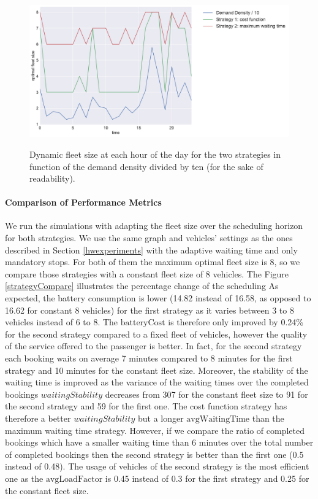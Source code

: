 \documentclass[12pt,a4paper]{article}
\begin{document}
\begin{figure}[h] 
  \centering
  \caption{Dynamic fleet size at each hour of the day for the two strategies in function of the demand density divided by ten (for the sake of readability).}
\includegraphics[scale=0.43]{./images/optimalFleet.pdf}
\label{optfleet}
\end{figure}

\paragraph{Comparison of Performance Metrics}
We run the simulations with adapting the fleet size over the scheduling horizon for both strategies. We use the same graph and vehicles' settings as the ones described in Section \ref{hwexperiments} with the adaptive waiting time and only mandatory stops. For both of them the maximum optimal fleet size is 8, so we compare those strategies with a constant fleet size of 8 vehicles. The Figure \ref{strategyCompare} illustrates the percentage change of the scheduling  As expected, the battery consumption is lower (14.82 instead of 16.58, as opposed to 16.62 for constant 8 vehicles) for the first strategy as it varies between 3 to 8 vehicles instead of 6 to 8. The $\text{batteryCost}$ is therefore only improved by 0.24\% for the second strategy compared to a fixed fleet of vehicles, however the quality of the service offered to the passenger is better. In fact, for the second strategy each booking waits on average 7 minutes compared to 8 minutes for the first strategy and 10 minutes for the constant fleet size. Moreover, the stability of the waiting time is improved as the variance of the waiting times over the completed bookings $waitingStability$ decreases from 307 for the constant fleet size to 91 for the second strategy and 59 for the first one. The cost function strategy has therefore a better $waitingStability$ but a longer $\text{avgWaitingTime}$ than the maximum waiting time strategy. However, if we compare the ratio of completed bookings which have a smaller waiting time than 6 minutes over the total number of completed bookings then the second strategy is better than the first one (0.5 instead of 0.48). The usage of vehicles of the second strategy is the most efficient one as the $\text{avgLoadFactor}$ is 0.45 instead of 0.3 for the first strategy and 0.25 for the constant fleet size.
\end{document}
